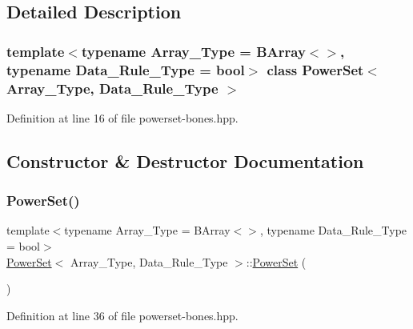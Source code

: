 \subsection{Detailed Description}
\subsubsection*{template$<$typename Array\+\_\+\+Type = B\+Array$<$$>$, typename Data\+\_\+\+Rule\+\_\+\+Type = bool$>$\newline
class Power\+Set$<$ Array\+\_\+\+Type, Data\+\_\+\+Rule\+\_\+\+Type $>$}



Definition at line 16 of file powerset-\/bones.\+hpp.



\subsection{Constructor \& Destructor Documentation}
\mbox{\label{class_power_set_a095815ccc44c88e0da73d92c6b5cf5f3}} 
\subsubsection{\texorpdfstring{Power\+Set()}{PowerSet()}\hspace{0.1cm}{\footnotesize\ttfamily [1/2]}}
{\footnotesize\ttfamily template$<$typename Array\+\_\+\+Type  = B\+Array$<$$>$, typename Data\+\_\+\+Rule\+\_\+\+Type  = bool$>$ \\
\hyperlink{class_power_set}{Power\+Set}$<$ Array\+\_\+\+Type, Data\+\_\+\+Rule\+\_\+\+Type $>$\+::\hyperlink{class_power_set}{Power\+Set} (\begin{DoxyParamCaption}{ }\end{DoxyParamCaption})\hspace{0.3cm}{\ttfamily [inline]}}



Definition at line 36 of file powerset-\/bones.\+hpp.

\mbox{\label{class_power_set_abf6ac4224da7ae4d187d0d63833615b1}} 
